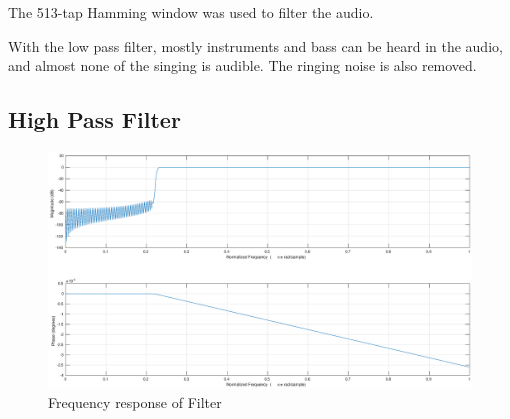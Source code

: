 \documentclass{article}
\begin{document}
The 513-tap Hamming window was used to filter the audio.

With the low pass filter, mostly instruments and bass can be heard in the audio, and almost none of the singing is audible. The ringing noise is also removed.

\subsection*{High Pass Filter}

\begin{figure}[H]
    \centering
    \includegraphics[width=\textwidth]{hamming_hpf}
    \caption{Frequency response of Filter}
    \label{fig:filt2}
\end{figure}
\end{document}
